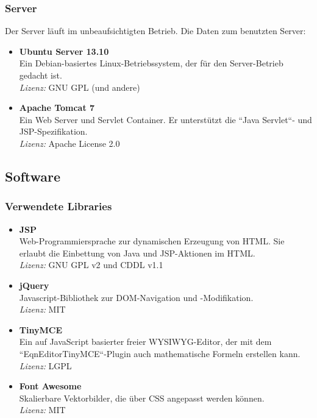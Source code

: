 \subsubsection{Server}
Der Server läuft im unbeaufsichtigten Betrieb. Die Daten zum benutzten Server:
\begin{itemize}
	\item \textbf{Ubuntu Server 13.10} \\
	Ein Debian-basiertes Linux-Betriebssystem, der für den Server-Betrieb gedacht ist. \\
	\textit{Lizenz:} GNU GPL (und andere)
	\item \textbf{Apache Tomcat 7} \\
	Ein Web Server und Servlet Container. Er unterstützt die ``Java Servlet``-  und JSP-Spezifikation. \\
	\textit{Lizenz:} Apache License 2.0
\end{itemize}

\subsection{Software}
\subsubsection{Verwendete Libraries}
\begin{itemize}
	\item \textbf{JSP} \\
	Web-Programmiersprache zur dynamischen Erzeugung von HTML. Sie erlaubt die Einbettung von Java und JSP-Aktionen im HTML. \\
	\textit{Lizenz:} GNU GPL v2 und CDDL v1.1
	\item \textbf{jQuery} \\
	Javascript-Bibliothek zur DOM-Navigation und -Modifikation.\\
	\textit{Lizenz:} MIT
	\item \textbf{TinyMCE} \\
	Ein auf JavaScript basierter freier WYSIWYG-Editor, der mit dem ``EqnEditor\-TinyMCE``-Plugin auch mathematische Formeln erstellen kann. \\
	\textit{Lizenz:} LGPL
	\item \textbf{Font Awesome} \\
	Skalierbare Vektorbilder, die über CSS angepasst werden können. \\
	\textit{Lizenz:} MIT
\end{itemize}